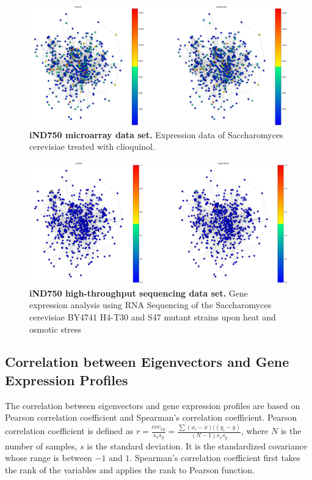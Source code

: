 \documentclass{article} %
\begin{document}
\begin{figure}[H]
      \graphicspath{ {images/} }
      \begin{center}
            \includegraphics[scale=0.2]{images/iND750-expression.png}
      \end{center}
      \caption{\textbf{iND750 microarray data set.} Expression data of Saccharomyces cerevisiae treated with clioquinol.}
      \label{fig:iND750-expression}
\end{figure}

\begin{figure}[H]
      \graphicspath{ {images/} }
      \begin{center}
            \includegraphics[scale=0.2]{images/iND750-rna-exp.png}
      \end{center}
      \caption{\textbf{iND750 high-throughput sequencing data set.} Gene expression analysis using RNA Sequencing of the Saccharomyces cerevisiae BY4741 H4-T30 and S47 mutant strains upon heat and osmotic stress}
      \label{fig:iND750-rna-seq}
\end{figure}

\subsection{Correlation between Eigenvectors and Gene Expression Profiles}
The correlation between eigenvectors and gene expression profiles are based on Pearson correlation coefficient and Spearman's correlation coefficient. Pearson correlation coefficient is defined as $r=\frac{cov_{xy}}{s_xs_y}=\frac{\sum(x_i-\overline{x})((y_i-\overline{y})}{(N-1)s_xs_y}$, where $N$ is the number of samples, $s$ is the standard deviation. It is the standardized covariance whose range is between $-1$ and $1$. Spearman's correlation coefficient first takes the rank of the variables and applies the rank to Pearson function. 
\end{document}
